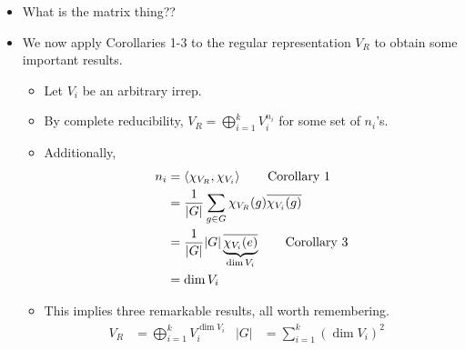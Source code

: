 \documentclass[../notes.tex]{subfiles}
\begin{document}
\begin{itemize}
    \begin{proof}
        We can compute its character $\chi_{V_R}$ by considering the corresponding permutation matrices. Indeed, the action $\chi_{V_R}(g)$ of this character on $g$ is equal to the number of 1's on the diagonal in the permuttion matrix, which is equal to the number of fixed points of the permutation, i.e., the number of $i$'s such that $gg_i=g_i$. But in a group, $gg_i=g_i$ iff $g=e$, so this number of fixed points is
        \begin{equation*}
            \chi_{V_R}(g) = \Fix(g)
            =
            \begin{pmatrix}
                g_1 & \cdots & g_n\\
                gg_1 & \cdots & gg_n\\
            \end{pmatrix}
            =
            \begin{cases}
                0 & g\neq e\\
                |G| & g=e
            \end{cases}
        \end{equation*}
        as desired.
    \end{proof}
    \item What is the matrix thing??
    \item We now apply Corollaries 1-3 to the regular representation $V_R$ to obtain some important results.
    \begin{itemize}
        \item Let $V_i$ be an arbitrary irrep.
        \item By complete reducibility, $V_R=\bigoplus_{i=1}^kV_i^{n_i}$ for some set of $n_i$'s.
        \item Additionally,
        \begin{align*}
            n_i &= \left\langle{\chi_{V_R},\chi_{V_i}}\right\rangle\tag*{Corollary 1}\\
            &= \frac{1}{|G|}\sum_{g\in G}\chi_{V_R}(g)\overline{\chi_{V_i}(g)}\\
            &= \frac{1}{|G|}|G|\underbrace{\overline{\chi_{V_i}(e)}}_{\dim V_i}\tag*{Corollary 3}\\
            &= \dim V_i
        \end{align*}
        \item This implies three remarkable results, all worth remembering.
        \begin{align*}
            V_R &= \bigoplus_{i=1}^kV_i^{\dim V_i}&
            |G| &= \sum_{i=1}^k(\dim V_i)^2&

\end{align*}
\end{itemize}
\end{itemize}
\end{document}
